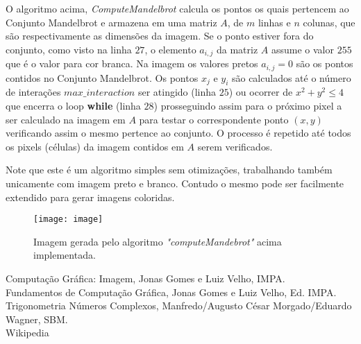 \documentclass[12pt,a4paper]{article}
\begin{document}
	
	O algoritmo acima, \textit{ComputeMandelbrot} calcula os pontos os quais pertencem ao Conjunto Mandelbrot e armazena em uma matriz $A$, de $m$ linhas e $n$ colunas, que são respectivamente as dimensões da imagem. Se o ponto estiver fora do conjunto, como visto na linha $27$, o elemento $a_{i,j}$ da matriz $A$ assume o valor $255$ que é o valor para cor branca. Na imagem os valores pretos $a_{i,j} = 0$ são os pontos contidos no Conjunto Mandelbrot. Os pontos $x_j$ e $y_i$ são calculados até o número de interações $max\_interaction$ ser atingido (linha $25$) ou ocorrer de $x^2 + y^2 \leq 4$ que encerra o loop \textbf{while} (linha $28$) prosseguindo assim para o próximo pixel a ser calculado na imagem em $A$ para testar o correspondente ponto $(x,y)$ verificando assim o mesmo pertence ao conjunto. O processo é repetido até todos os pixels (células) da imagem contidos em $A$ serem verificados.
	
	Note que este é um algoritmo simples sem otimizações, trabalhando também unicamente com imagem preto e branco. Contudo o mesmo pode ser facilmente extendido para gerar imagens coloridas.\\
	
	\begin{figure}[h]
		\centering
		\texttt{[image: image]}
		\caption{Imagem gerada pelo algoritmo \textit{"computeMandebrot"} acima implementada.}
		\label{fig:image}
	\end{figure}
	
\newpage

\begin{thebibliography}{9}
	 Computação Gráfica: Imagem, Jonas Gomes e Luiz Velho, IMPA.\\
	
	 Fundamentos de Computação Gráfica, Jonas Gomes e Luiz Velho, Ed. IMPA.\\
	
	  Trigonometria Números Complexos, Manfredo/Augusto César Morgado/Eduardo Wagner, SBM.\\
	
	 Wikipedia 
	
\end{thebibliography}
\end{document}
